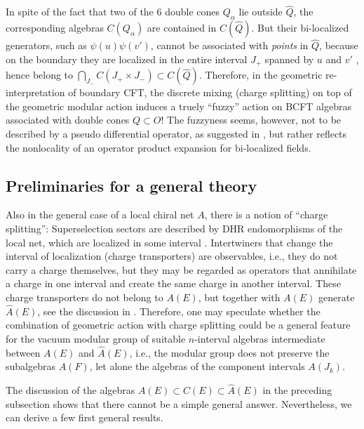 \documentclass[12pt]{article}
\begin{document}
In spite of the fact that two of the 6 double cones $Q_\alpha$ lie
outside $\widehat Q$, the corresponding algebras $C(Q_\alpha)$ are
contained in $C(\widehat Q)$. But their bi-localized generators, such
as $\psi(u)\psi(v')$, cannot be associated with {\em points} in
$\widehat Q$, because on the boundary they are localized in the entire
interval $J_+$ spanned by $u$ and $v'$ \cite{LR09}, hence belong 
to $\bigcap_{J_-}C(J_+\times J_-)\subset C(\widehat Q)$. Therefore, in
the geometric re-interpretation of boundary CFT, the discrete mixing
(charge splitting) on top of the geometric modular action induces a  
truely ``fuzzy'' action on BCFT algebras associated with double cones
$Q\subset O$! The fuzzyness seems, however, not to be described by a
pseudo differential operator, as suggested in \cite{SW,TS}, but rather 
reflects the nonlocality of an operator product expansion for
bi-localized fields.


\subsection{Preliminaries for a general theory}

Also in the general case of a local chiral net $A$, there is a notion
of ``charge splitting'': Superselection sectors are described by DHR
endomorphisms of the local net, which are localized in some interval
\cite{DHR}. Intertwiners that change the interval of localization 
(charge transporters) are observables, i.e., they do not carry a
charge themselves, but they may be regarded as operators that
annihilate a charge in one interval and create the same charge in
another interval. These charge transporters do not belong to $A(E)$,
but together with $A(E)$ generate $\widehat A(E)$, see the discussion in
\cite{KLM}. Therefore, one may speculate whether the combination of
geometric action with charge splitting could be a general feature for
the vacuum modular group of suitable $n$-interval algebras
intermediate between $A(E)$ and $\widehat A(E)$, i.e., the modular
group does not preserve the subalgebras $A(F)$, let alone the algebras
of the component intervals $A(J_k)$.   

The discussion of the algebras $A(E)\subset C(E)\subset
\widehat A(E)$ in the preceding subsection shows that there cannot be a
simple general answer. Nevertheless, we can derive a few first general
results.  

\medskip
\end{document}
